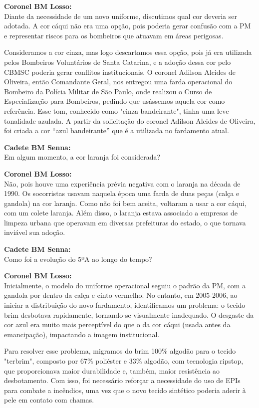 \noindent \textbf{Coronel BM Losso:} \\ Diante da necessidade de um novo uniforme, discutimos qual cor deveria ser adotada. A cor cáqui não era uma opção, pois poderia gerar confusão com a PM e representar riscos para os bombeiros que atuavam em áreas perigosas. 

\noindent Consideramos a cor cinza, mas logo descartamos essa opção, pois já era utilizada pelos Bombeiros Voluntários de Santa Catarina, e a adoção dessa cor pelo CBMSC poderia gerar conflitos institucionais. O coronel Adilson Alcides de Oliveira, então Comandante Geral, nos entregou uma farda operacional do Bombeiro da Polícia Militar de São Paulo, onde realizou o Curso de Especialização para Bombeiros, pedindo que usássemos aquela cor como referência. Esse tom, conhecido como "cinza bandeirante", tinha uma leve tonalidade azulada. A partir da solicitação do coronel Adilson Alcides de Oliveira, foi criada a cor “azul bandeirante” que é a utilizada no fardamento atual.

\noindent \textbf{Cadete BM Senna:} \\ Em algum momento, a cor laranja foi considerada?

\noindent \textbf{Coronel BM Losso:} \\ Não, pois houve uma experiência prévia negativa com o laranja na década de 1990. Os socorristas usavam naquela época uma farda de duas peças (calça e gandola) na cor laranja. Como não foi bem aceita, voltaram a usar a cor cáqui, com um colete laranja. Além disso, o laranja estava associado a empresas de limpeza urbana que operavam em diversas prefeituras do estado, o que tornava inviável sua adoção.

\noindent \textbf{Cadete BM Senna:} \\ Como foi a evolução do 5ºA ao longo do tempo?

\noindent \textbf{Coronel BM Losso:} \\ Inicialmente, o modelo do uniforme operacional seguiu o padrão da PM, com a gandola por dentro da calça e cinto vermelho. No entanto, em 2005-2006, ao iniciar a distribuição do novo fardamento, identificamos um problema: o tecido brim desbotava rapidamente, tornando-se visualmente inadequado. O desgaste da cor azul era muito mais perceptível do que o da cor cáqui (usada antes da emancipação), impactando a imagem institucional.

\noindent Para resolver esse problema, migramos do brim 100\% algodão para o tecido "terbrim", composto por 67\% poliéster e 33\% algodão, com tecnologia ripstop, que proporcionava maior durabilidade e, também, maior resistência ao desbotamento. Com isso, foi necessário reforçar a necessidade do uso de EPIs para combate a incêndios, uma vez que o novo tecido sintético poderia aderir à pele em contato com chamas.

